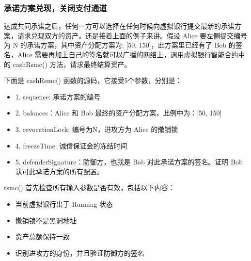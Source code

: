 \subsubsection{承诺方案兑现，关闭支付通道}
达成共同承诺之后，任何一方可以选择在任何时候向虚拟银行提交最新的承诺方案，请求兑现双方的资产。还是接着上面的例子来讲。假设 Alice 要左侧提交编号为 N 的承诺方案，其中资产分配方案为: [50, 150]，此方案里已经有了 Bob 的签名，Alice 需要再加上自己的签名就可以广播的网络上，调用虚拟银行智能合约中的 cashRsmc() 方法，请求最终结算资产。

下面是 cashRsmc() 函数的源码，它接受5个参数，分别是：
\begin{itemize}
    \item 1. sequence: 承诺方案的编号
    \item 2. balances：Alice 和 Bob 最终的资产分配方案，此例中为：[50, 150]
    \item 3. revocationLock: 编号为N，进攻方为 Alice 的撤销锁
    \item 4. freezeTime: 诚信保证金的冻结时间
    \item 5. defenderSignature：防御方，也就是 Bob 对此承诺方案的签名。证明 Bob 认可此承诺方案的所有配置。
\end{itemize}

rsmc() 首先检查所有输入参数是否有效，包括以下内容：

\begin{itemize}
    \item 当前虚拟银行出于 Running 状态
    \item 撤销锁不是黑洞地址
    \item 资产总额保持一致
    \item 识别进攻方的身份，并且验证防御方的签名
\end{itemize}

